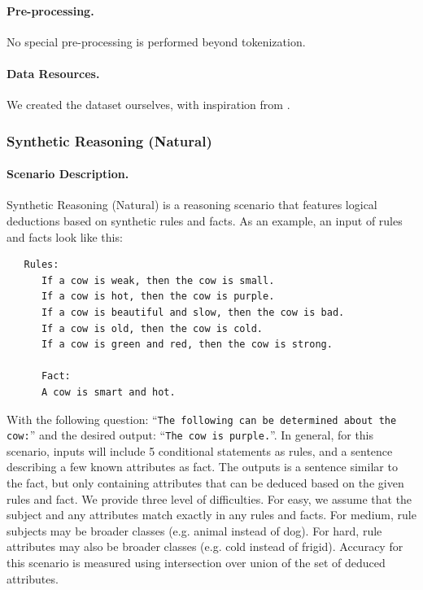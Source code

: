 \paragraph{Pre-processing.} No special pre-processing is performed beyond tokenization.


\paragraph{Data Resources.}
We created the dataset ourselves, with inspiration from \citep{wu2021lime}.


\subsubsection{Synthetic Reasoning (Natural)}

\paragraph{Scenario Description.}
Synthetic Reasoning (Natural) is a reasoning scenario that features logical deductions based on synthetic rules and facts.
As an example, an input of rules and facts look like this:

\begin{verbatim}
   Rules:
      If a cow is weak, then the cow is small.
      If a cow is hot, then the cow is purple.
      If a cow is beautiful and slow, then the cow is bad.
      If a cow is old, then the cow is cold.
      If a cow is green and red, then the cow is strong.
      
      Fact:
      A cow is smart and hot.
\end{verbatim}



With the following question: ``\texttt{The following can be determined about the cow:}'' and the desired output: ``\texttt{The cow is purple.}''. In general, for this scenario, inputs will include 5 conditional statements as rules, and a sentence describing a few known attributes as fact. The outputs is a sentence similar to the fact, but only containing attributes that can be deduced based on the given rules and fact. We provide three level of difficulties. For easy, we assume that the subject and any attributes match exactly in any rules and facts. For medium, rule subjects may be broader classes (e.g. animal instead of dog). For hard, rule attributes may also be broader classes (e.g. cold instead of frigid). Accuracy for this scenario is measured using intersection over union of the set of deduced attributes. 

